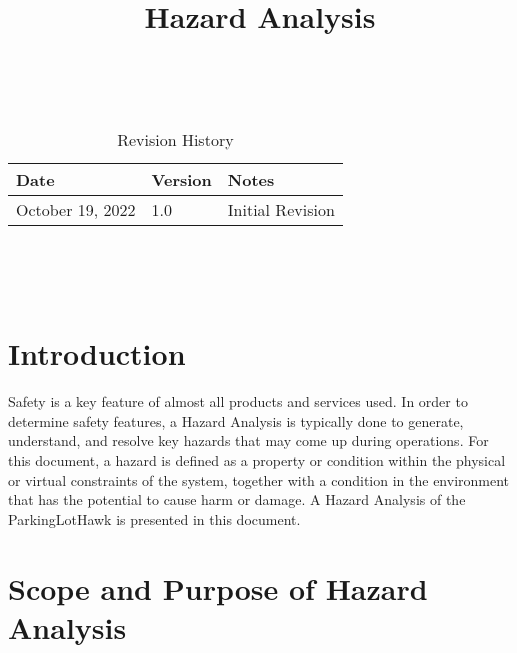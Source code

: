 \documentclass{article}
\title{Hazard Analysis\\\progname}
\author{\authname}
\date{}
\begin{document}
\maketitle
\thispagestyle{empty}

~\newpage


\begin{table}[hp]
\caption{Revision History} \label{TblRevisionHistory}
\begin{tabularx}{\textwidth}{llX}
\toprule
\toprule {\bf Date} & {\bf Version} & {\bf Notes}\\
\midrule
October 19, 2022 & 1.0 & Initial Revision \\
\bottomrule
\end{tabularx}
\end{table}

~\newpage

\tableofcontents

\listoftables

\listoffigures

~\newpage









\section{Introduction}

Safety is a key feature of almost all products and services used. In order to determine safety features, a Hazard Analysis is typically done to generate, understand, and resolve key hazards that may come up during operations. For this document, a hazard is defined as a property or condition within the physical or virtual constraints of the system, together with a condition in the environment that has the potential to cause harm or damage. A Hazard Analysis of the ParkingLotHawk is presented in this document. 

\section{Scope and Purpose of Hazard Analysis}
\end{document}
